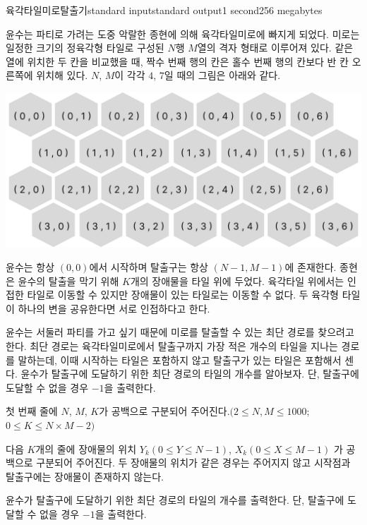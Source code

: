 \begin{problem}{육각타일미로탈출기}{standard input}{standard output}{1 second}{256 megabytes}

윤수는 파티로 가려는 도중 악랄한 종현에 의해 육각타일미로에 빠지게 되었다. 미로는 일정한 크기의 정육각형 타일로 구성된 $N$행 $M$열의 격자 형태로 이루어져 있다. 같은 열에 위치한 두 칸을 비교했을 때, 짝수 번째 행의 칸은 홀수 번째 행의 칸보다 반 칸 오른쪽에 위치해 있다. $N$, $M$이 각각 $4$, $7$일 때의 그림은 아래와 같다.
\begin{center}
\includegraphics[bb=0 0 100 200]{Group1.png}
\end{center} 

윤수는 항상 $(0,0)$에서 시작하며 탈출구는 항상 $(N-1, M-1)$에 존재한다. 종현은 윤수의 탈출을 막기 위해 $K$개의 장애물을 타일 위에 두었다. 육각타일 위에서는 인접한 타일로 이동할 수 있지만 장애물이 있는 타일로는 이동할 수 없다. 두 육각형 타일이 하나의 변을 공유한다면 서로 인접하다고 한다.  

윤수는 서둘러 파티를 가고 싶기 때문에 미로를 탈출할 수 있는 최단 경로를 찾으려고 한다. 최단 경로는 육각타일미로에서 탈출구까지 가장 적은 개수의 타일을 지나는 경로를 말하는데, 이때 시작하는 타일은 포함하지 않고 탈출구가 있는 타일은 포함해서 센다. 윤수가 탈출구에 도달하기 위한 최단 경로의 타일의 개수를 알아보자. 단, 탈출구에 도달할 수 없을 경우 $-1$을 출력한다. 

\InputFile
첫 번째 줄에 $N$, $M$, $K$가 공백으로 구분되어 주어진다.$(2 ≤ N, M ≤ 1000;$ $0 ≤ K ≤ N×M-2)$

다음 $K$개의 줄에 장애물의 위치 $Y_k$$(0 ≤ Y ≤ N-1)$, $X_k$$(0 ≤ X ≤ M-1)$ 가 공백으로 구분되어 주어진다. 두 장애물의 위치가 같은 경우는 주어지지 않고 시작점과 탈출구에는 장애물이 존재하지 않는다.


\OutputFile
윤수가 탈출구에 도달하기 위한 최단 경로의 타일의 개수를 출력한다. 단, 탈출구에 도달할 수 없을 경우 $-1$을 출력한다.

\Examples

\begin{example}
%
%
%
\end{example}

\end{problem}

